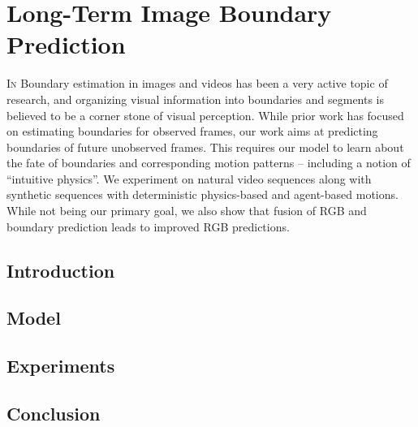 \chapter[Long-Term Image Boundary Prediction]{Long-Term Image Boundary Prediction}
\label{chap:aaai18}
\minitoc\vspace{2ex}
\lettrine[lines=3]{I}{n} Boundary estimation in images and videos has been a very active topic of research, and organizing visual information into boundaries and segments is believed to be a corner stone of visual perception. While prior work has focused on estimating boundaries for observed frames, our work aims at predicting boundaries of future unobserved frames. This requires our model to learn about the fate of boundaries and corresponding motion patterns -- including a notion of ``intuitive physics''. We experiment on natural video sequences along with synthetic sequences with deterministic physics-based and agent-based motions. While not being our primary goal, we also show that fusion of RGB and boundary prediction leads to improved  RGB predictions.
\section{Introduction}
\label{sec:aaai18:intro}




\section{Model} 
\label{sec:aaai18:model}


\section{Experiments}
\label{sec:aaai18:experiments}


\section{Conclusion}
\label{sec:aaa18:conclusion}
